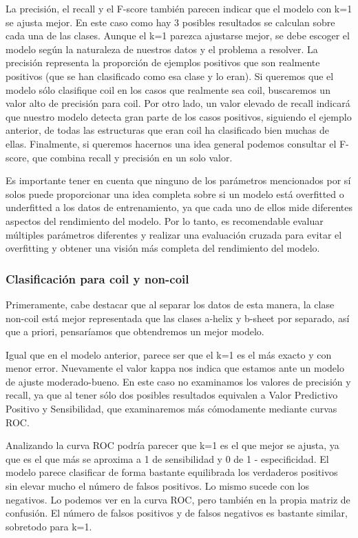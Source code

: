 \documentclass[
]{article}
\begin{document}
La precisión, el recall y el F-score también parecen indicar que el
modelo con k=1 se ajusta mejor. En este caso como hay 3 posibles
resultados se calculan sobre cada una de las clases. Aunque el k=1
parezca ajustarse mejor, se debe escoger el modelo según la naturaleza
de nuestros datos y el problema a resolver. La precisión representa la
proporción de ejemplos positivos que son realmente positivos (que se han
clasificado como esa clase y lo eran). Si queremos que el modelo sólo
clasifique coil en los casos que realmente sea coil, buscaremos un valor
alto de precisión para coil. Por otro lado, un valor elevado de recall
indicará que nuestro modelo detecta gran parte de los casos positivos,
siguiendo el ejemplo anterior, de todas las estructuras que eran coil ha
clasificado bien muchas de ellas. Finalmente, si queremos hacernos una
idea general podemos consultar el F-score, que combina recall y
precisión en un solo valor.

Es importante tener en cuenta que ninguno de los parámetros mencionados
por sí solos puede proporcionar una idea completa sobre si un modelo
está overfitted o underfitted a los datos de entrenamiento, ya que cada
uno de ellos mide diferentes aspectos del rendimiento del modelo. Por lo
tanto, es recomendable evaluar múltiples parámetros diferentes y
realizar una evaluación cruzada para evitar el overfitting y obtener una
visión más completa del rendimiento del modelo.

\hypertarget{clasificaciuxf3n-para-coil-y-non-coil}{%
\subsubsection{Clasificación para coil y
non-coil}\label{clasificaciuxf3n-para-coil-y-non-coil}}

Primeramente, cabe destacar que al separar los datos de esta manera, la
clase non-coil está mejor representada que las clases a-helix y b-sheet
por separado, así que a priori, pensaríamos que obtendremos un mejor
modelo.

Igual que en el modelo anterior, parece ser que el k=1 es el más exacto
y con menor error. Nuevamente el valor kappa nos indica que estamos ante
un modelo de ajuste moderado-bueno. En este caso no examinamos los
valores de precisión y recall, ya que al tener sólo dos posibles
resultados equivalen a Valor Predictivo Positivo y Sensibilidad, que
examinaremos más cómodamente mediante curvas ROC.

Analizando la curva ROC podría parecer que k=1 es el que mejor se
ajusta, ya que es el que más se aproxima a 1 de sensibilidad y 0 de 1 -
especificidad. El modelo parece clasificar de forma bastante equilibrada
los verdaderos positivos sin elevar mucho el número de falsos positivos.
Lo mismo sucede con los negativos. Lo podemos ver en la curva ROC, pero
también en la propia matriz de confusión. El número de falsos positivos
y de falsos negativos es bastante similar, sobretodo para k=1.
\end{document}
